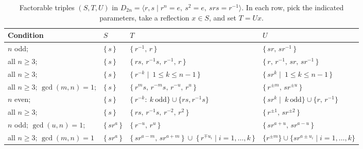 \documentclass{file}
\begin{document}
\begin{table}[H]
  \centering
  \caption{Factorable triples $(S,T,U)$ in $D_{2n}=\langle r,s\mid r^n=e,\ s^2=e,\ srs=r^{-1}\rangle$.
  In each row, pick the indicated parameters, take a reflection $x\in S$, and set $T=Ux$.}
  \label{tab:condition-STU-dihedral}
  \setlength{\tabcolsep}{10pt}
  \renewcommand{\arraystretch}{1.15}
  \begin{tabular}{@{}p{}p{}p{}p{}@{}}
    \toprule
    \textbf{Condition} & \textbf{$S$} & \textbf{$T$} & \textbf{$U$} \\
    \midrule \midrule

    $n$ odd;  &
    $\{\,s\,\}$ &
    $\{\,r^{-1},\,r\,\}$ &
    $\{\,sr,\,sr^{-1}\,\}$ \\

    all $n\ge3$; &
    $\{\,s\,\}$ &
    $\{\,rs,\,r^{-1}s,\,r^{-1},\,r\,\}$ &
    $\{\,r,\,r^{-1},\,sr,\,sr^{-1}\,\}$ \\

    all $n\ge3$;  &
    $\{\,s\,\}$ &
    $\{\,r^{-k}\mid \ 1\le k\le n-1\,\}$ &
    $\{\,sr^k\mid \ 1\le k\le n-1\,\}$ \\

    all $n\ge3$;  $\gcd(m,n)=1$; &
    $\{\,s\,\}$ &
    $\{\,r^{m}s,\,r^{-m}s,\,r^{-u},\,r^{u}\,\}$ &
    $\{\,r^{\pm m},\,sr^{\pm u}\,\}$ \\

    $n$ even;  &
    $\{\,s\,\}$ &
    $\{\,r^{-k}:\ k\ \text{odd}\}\cup\{rs,r^{-1}s\}$ &
    $\{\,sr^{k}\mid \ k\ \text{odd}\}\cup\{r,\,r^{-1}\}$ \\

    all $n\ge3$;  &
    $\{\,s\,\}$ &
    $\{\,rs,\,r^{-1}s,\,r^{-2},\,r^{2}\,\}$ &
    $\{\,r^{\pm1},\,sr^{\pm2}\,\}$ \\

    $n$ odd;  $\gcd(u,n)=1$; &
    $\{\,sr^{a}\,\}$ &
    $\{\,r^{-u},\,r^{u}\,\}$ &
    $\{\,sr^{a+u},\,sr^{a-u}\,\}$ \\

    all $n\ge3$; $\gcd(m,n)=1$ &
    $\{\,sr^{a}\,\}$ &
    $\{\,sr^{a-m},\,sr^{a+m}\,\}\ \cup\ \{\,r^{\mp u_i}\mid i=1,\dots,k\,\}$ &
    $\{r^{\pm m}\}\cup\{sr^{a\pm u_i}\mid i=1,\dots,k\}$ \\

    \bottomrule
  \end{tabular}
\end{table}
\end{document}
